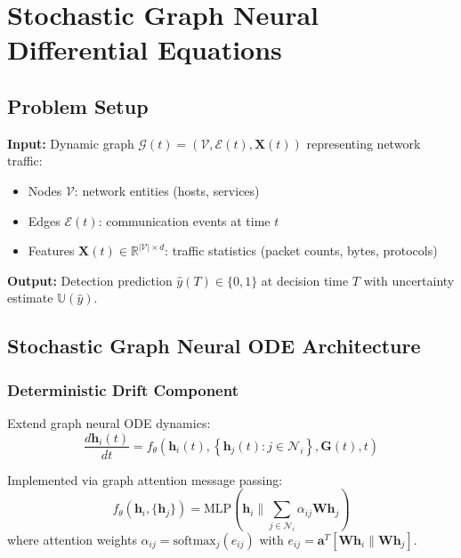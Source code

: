 \documentclass{article}
\begin{document}
\section{Stochastic Graph Neural Differential Equations}

\subsection{Problem Setup}

\textbf{Input:} Dynamic graph $\mathcal{G}(t) = (\mathcal{V}, \mathcal{E}(t), \mathbf{X}(t))$ representing network traffic:
\begin{itemize}
\item Nodes $\mathcal{V}$: network entities (hosts, services)
\item Edges $\mathcal{E}(t)$: communication events at time $t$
\item Features $\mathbf{X}(t) \in \mathbb{R}^{|\mathcal{V}| \times d}$: traffic statistics (packet counts, bytes, protocols)
\end{itemize}

\textbf{Output:} Detection prediction $\hat{y}(T) \in \{0, 1\}$ at decision time $T$ with uncertainty estimate $\mathbb{U}(\hat{y})$.

\subsection{Stochastic Graph Neural ODE Architecture}

\subsubsection{Deterministic Drift Component}

Extend graph neural ODE dynamics:
\begin{equation}
\frac{d\mathbf{h}_i(t)}{dt} = f_\theta\left(\mathbf{h}_i(t), \left\{\mathbf{h}_j(t) : j \in \mathcal{N}_i\right\}, \mathbf{G}(t), t\right)
\end{equation}

Implemented via graph attention message passing:
\begin{equation}
f_\theta(\mathbf{h}_i, \{\mathbf{h}_j\}) = \text{MLP}\left(\mathbf{h}_i \| \sum_{j \in \mathcal{N}_i} \alpha_{ij} \mathbf{W} \mathbf{h}_j\right)
\end{equation}
where attention weights $\alpha_{ij} = \text{softmax}_j(e_{ij})$ with $e_{ij} = \mathbf{a}^T[\mathbf{W}\mathbf{h}_i \| \mathbf{W}\mathbf{h}_j]$.
\end{document}
